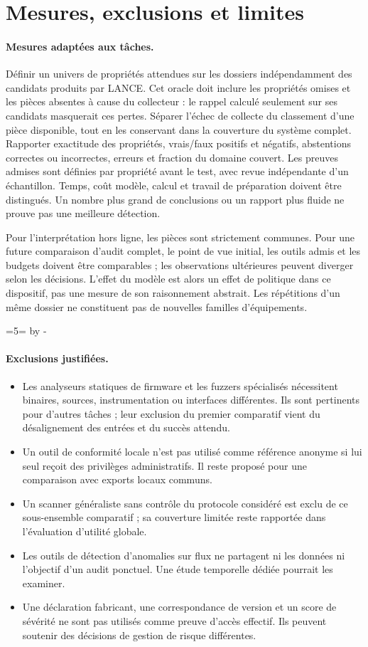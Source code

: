 \documentclass[11pt,a4paper]{article}
\newcommand{\reserveSpace}[1]{\par\begingroup\dimen0=#1\relax\dimen2=\pagegoal\advance\dimen2 by -\pagetotal\ifdim\dimen0>\dimen2\newpage\fi\endgroup}
\begin{document}
\section{Mesures, exclusions et limites}
\paragraph{Mesures adaptées aux tâches.}
Définir un univers de propriétés attendues sur les dossiers indépendamment des candidats produits par LANCE. Cet oracle doit inclure les propriétés omises et les pièces absentes à cause du collecteur : le rappel calculé seulement sur ses candidats masquerait ces pertes. Séparer l'échec de collecte du classement d'une pièce disponible, tout en les conservant dans la couverture du système complet. Rapporter exactitude des propriétés, vrais/faux positifs et négatifs, abstentions correctes ou incorrectes, erreurs et fraction du domaine couvert. Les preuves admises sont définies par propriété avant le test, avec revue indépendante d'un échantillon. Temps, coût modèle, calcul et travail de préparation doivent être distingués. Un nombre plus grand de conclusions ou un rapport plus fluide ne prouve pas une meilleure détection.

Pour l'interprétation hors ligne, les pièces sont strictement communes. Pour une future comparaison d'audit complet, le point de vue initial, les outils admis et les budgets doivent être comparables ; les observations ultérieures peuvent diverger selon les décisions. L'effet du modèle est alors un effet de politique dans ce dispositif, pas une mesure de son raisonnement abstrait. Les répétitions d'un même dossier ne constituent pas de nouvelles familles d'équipements.

\reserveSpace{5\baselineskip}
\paragraph{Exclusions justifiées.}
\begin{itemize}
\item Les analyseurs statiques de firmware et les fuzzers spécialisés nécessitent binaires, sources, instrumentation ou interfaces différentes. Ils sont pertinents pour d'autres tâches ; leur exclusion du premier comparatif vient du désalignement des entrées et du succès attendu.
\item Un outil de conformité locale n'est pas utilisé comme référence anonyme si lui seul reçoit des privilèges administratifs. Il reste proposé pour une comparaison avec exports locaux communs.
\item Un scanner généraliste sans contrôle du protocole considéré est exclu de ce sous-ensemble comparatif ; sa couverture limitée reste rapportée dans l'évaluation d'utilité globale.
\item Les outils de détection d'anomalies sur flux ne partagent ni les données ni l'objectif d'un audit ponctuel. Une étude temporelle dédiée pourrait les examiner.
\item Une déclaration fabricant, une correspondance de version et un score de sévérité ne sont pas utilisés comme preuve d'accès effectif. Ils peuvent soutenir des décisions de gestion de risque différentes.
\end{itemize}
\end{document}
